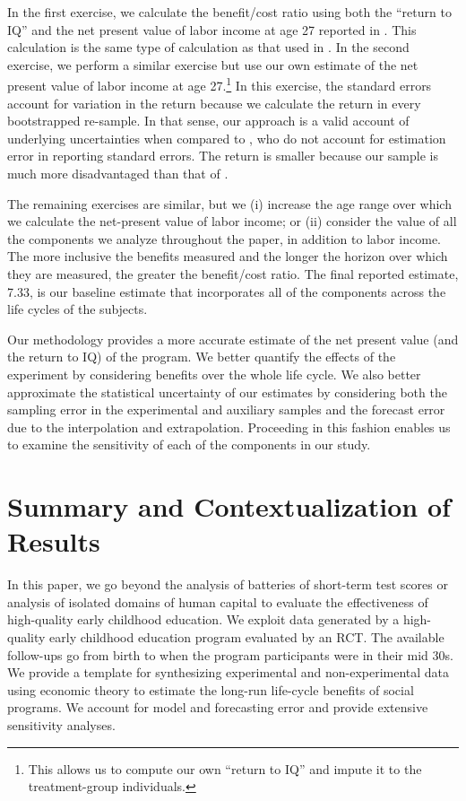 In the first exercise, we calculate the benefit/cost ratio using both the ``return to IQ'' and the net present value of labor income at age 27 reported in \citet{Chetty_Friedman_etal_2011_QJoE}. This calculation is the same type of calculation as that used in \citet{Kline_Walters_2016_QJE}. In the second exercise, we perform a similar exercise but use our own estimate of the net present value of labor income at age 27.\footnote{This allows us to compute our own ``return to IQ'' and impute it to the treatment-group individuals.} In this exercise, the standard errors account for variation in the return because we calculate the return in every bootstrapped re-sample. In that sense, our approach is a valid account of underlying uncertainties when compared to \citet{Kline_Walters_2016_QJE}, who do not account for estimation error in reporting standard errors. The return is smaller because our sample is much more disadvantaged than that of \citet{Chetty_Friedman_etal_2011_QJoE}.

The remaining exercises are similar, but we (i) increase the age range over which we calculate the net-present value of labor income; or (ii) consider the value of all the components we analyze throughout the paper, in addition to labor income. The more inclusive the benefits measured and the longer the horizon over which they are measured, the greater the benefit/cost ratio. The final reported estimate, 7.33, is our baseline estimate that incorporates all of the components across the life cycles of the subjects.

Our methodology provides a more accurate estimate of the net present value (and the return to IQ) of the program. We better quantify the effects of the experiment by considering benefits over the whole life cycle. We also better approximate the statistical uncertainty of our estimates by considering both the sampling error in the experimental and auxiliary samples and the forecast error due to the interpolation and extrapolation. Proceeding in this fashion enables us to examine the sensitivity of each of the components in our study.

\section{Summary and Contextualization of Results} \label{section:conclusion}

In this paper, we go beyond the analysis of batteries of short-term test scores or analysis of isolated domains of human capital to evaluate the effectiveness of high-quality early childhood education. We exploit data generated by a high-quality early childhood education program evaluated by an RCT. The available follow-ups go from birth to when the program participants were in their mid 30s. We provide a template for synthesizing experimental and non-experimental data using economic theory to estimate the long-run life-cycle benefits of social programs. We account for model and forecasting error and provide extensive sensitivity analyses. 

